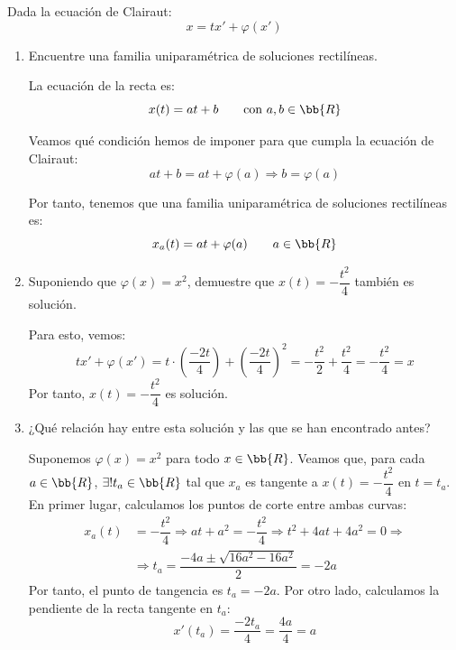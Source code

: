 \begin{ejercicio}
    Dada la ecuación de Clairaut:
    \begin{equation*}
        x = tx' + \varphi(x')
    \end{equation*}
    \begin{enumerate}
        \item Encuentre una familia uniparamétrica de soluciones rectilíneas.
        
        La ecuación de la recta es:
        \begin{equation*}
            x(t)=at + b \qquad \text{con } a, b\in \bb{R}
        \end{equation*}

        Veamos qué condición hemos de imponer para que cumpla la ecuación de Clairaut:
        \begin{equation*}
            at + b = at + \varphi(a) \Longrightarrow b = \varphi(a)
        \end{equation*}

        Por tanto, tenemos que una familia uniparamétrica de soluciones rectilíneas es:
        \begin{equation*}
            x_a(t) = at + \varphi(a) \qquad a\in \bb{R}
        \end{equation*}
        \item Suponiendo que \(\varphi(x) = x^2\), demuestre que \(x(t) = -\dfrac{t^2}{4}\) también es solución.
        
        Para esto, vemos:
        \begin{equation*}
            tx'+\varphi(x') = t\cdot \left(\dfrac{-2t}{4}\right) + \left(\dfrac{-2t}{4}\right)^2 = -\dfrac{t^2}{2} + \dfrac{t^2}{4} = -\dfrac{t^2}{4} = x
        \end{equation*}
        Por tanto, \(x(t) = -\dfrac{t^2}{4}\) es solución.
        \item ¿Qué relación hay entre esta solución y las que se han encontrado antes?
        
        Suponemos $\varphi(x)=x^2$ para todo $x\in \bb{R}$. Veamos que, para cada $a\in \bb{R}$, $\exists ! t_a\in \bb{R}$ tal que $x_a$ es tangente a $x(t)=-\dfrac{t^2}{4}$ en $t=t_a$.\\

        En primer lugar, calculamos los puntos de corte entre ambas curvas:
        \begin{align*}
            x_a(t) &= -\dfrac{t^2}{4} \Longrightarrow at + a^2 = -\dfrac{t^2}{4} \Longrightarrow t^2 + 4at + 4a^2 = 0
            \Longrightarrow\\&\Longrightarrow t_a=\dfrac{-4a\pm \sqrt{16a^2-16a^2}}{2} = -2a
        \end{align*}
        Por tanto, el punto de tangencia es $t_a=-2a$. Por otro lado, calculamos la pendiente de la recta tangente en $t_a$:
        \begin{equation*}
            x'(t_a) = \frac{-2t_a}{4} = \frac{4a}{4} = a
        \end{equation*}


\end{enumerate}
\end{ejercicio}
